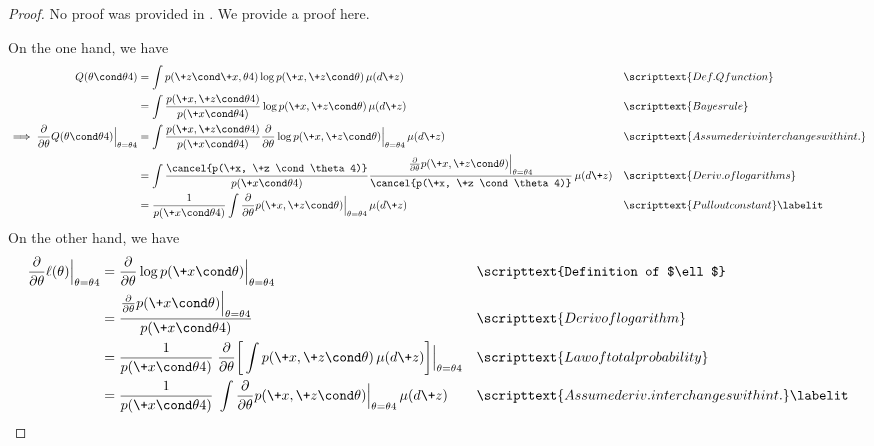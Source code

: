 \documentclass{article} %
\newcommand{\param}{\theta}
\begin{document}
\begin{proof} No proof was provided in \citet{salakhutdinov2002relationship}. We provide a proof here.

On the one hand, we have
%
\begin{align*}
Q(\param \cond \param^^t) &= \int p(\+z \cond \+x, \param^^t) \log p(\+x, \+z \cond \param) \, \mu(d\+z) && \scripttext{Def. Q function} \\
&= \int \frac{p(\+x, \+z \cond \param^^t)}{p(\+x \cond \param^^t)} \log p(\+x, \+z \cond \param) \, \mu(d\+z) && \scripttext{Bayes rule} \\
\implies \frac{\partial}{\partial \param} Q(\param \cond \param^^t)  \Bigr|_{\param=\param^^t} &= \int \frac{p(\+x, \+z \cond \param^^t)}{p(\+x \cond \param^^t)} \frac{\partial}{\partial \param} \log p(\+x, \+z \cond \param)\Bigr|_{\param=\param^^t} \, \mu(d\+z) && \scripttext{Assume deriv interchanges with int.} \\
&= \int \frac{\cancel{p(\+x, \+z \cond \param^^t)}}{p(\+x \cond \param^^t)} \frac{\frac{\partial}{\partial \param} p(\+x, \+z \cond \param) \Bigr|_{\param=\param^^t}}{\cancel{p(\+x, \+z \cond \param^^t)}} \, \mu(d\+z) && \scripttext{Deriv. of logarithms} \\
&= \frac{1}{p(\+x \cond \param^^t)}  \int \frac{\partial}{\partial \param} p(\+x, \+z \cond \param) \Bigr|_{\param=\param^^t}\, \mu(d\+z) && \scripttext{Pull out constant} \labelit \label{eqn:intermediate_result_1_for_proposition_that_Q_function_and_log_marginal_likelihood_have_the_same_gradients}
\end{align*}
%
On the other hand, we have
%
\begin{align*}
\frac{\partial}{\partial \param} \ell(\param) \Bigr|_{\param=\param^^t} &= \frac{\partial}{\partial \param} \log p(\+x \cond \param)\Bigr|_{\param=\param^^t}  && \scripttext{Definition of $\ell$} \\
 &= \frac{\frac{\partial}{\partial \param} p(\+x \cond \param) \Bigr|_{\param=\param^^t}}{p(\+x \cond \param^^t)} && \scripttext{Deriv of logarithm} \\
  &= \frac{1}{p(\+x \cond \param^^t)} \; \frac{\partial}{\partial \param} \bigg[ \int p(\+x, \+z \cond \param) \, \mu(d\+z) \bigg]\Bigr|_{\param=\param^^t} && \scripttext{Law of total probability} \\
    &= \frac{1}{p(\+x \cond \param^^t)} \;  \int \frac{\partial}{\partial \param}  p(\+x, \+z \cond \param) \Bigr|_{\param=\param^^t} \, \mu(d\+z) && \scripttext{Assume deriv. interchanges with int.} \labelit \label{eqn:intermediate_result_2_for_proposition_that_Q_function_and_log_marginal_likelihood_have_the_same_gradients}

\end{align*}
\end{proof}
\end{document}
